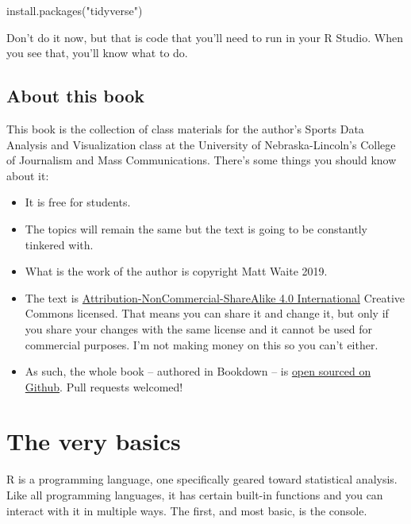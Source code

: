 \documentclass[
]{book}
\newenvironment{Shaded}{\begin{snugshade}}{\end{snugshade}}
\newcommand{\FunctionTok}[1]{\textcolor[rgb]{0.00,0.00,0.00}{#1}}
\newcommand{\NormalTok}[1]{#1}
\newcommand{\StringTok}[1]{\textcolor[rgb]{0.31,0.60,0.02}{#1}}
\providecommand{\tightlist}{%
  \setlength{\itemsep}{0pt}\setlength{\parskip}{0pt}}
\begin{document}
\begin{Shaded}
\begin{Highlighting}[]
\FunctionTok{install.packages}\NormalTok{(}\StringTok{"tidyverse"}\NormalTok{)}
\end{Highlighting}
\end{Shaded}

Don't do it now, but that is code that you'll need to run in your R Studio. When you see that, you'll know what to do.

\hypertarget{about-this-book}{%
\section{About this book}\label{about-this-book}}

This book is the collection of class materials for the author's Sports Data Analysis and Visualization class at the University of Nebraska-Lincoln's College of Journalism and Mass Communications. There's some things you should know about it:

\begin{itemize}
\tightlist
\item
  It is free for students.
\item
  The topics will remain the same but the text is going to be constantly tinkered with.
\item
  What is the work of the author is copyright Matt Waite 2019.
\item
  The text is \href{https://creativecommons.org/licenses/by-nc-sa/4.0/}{Attribution-NonCommercial-ShareAlike 4.0 International} Creative Commons licensed. That means you can share it and change it, but only if you share your changes with the same license and it cannot be used for commercial purposes. I'm not making money on this so you can't either.\\
\item
  As such, the whole book -- authored in Bookdown -- is \href{https://github.com/mattwaite/sportsdatabook}{open sourced on Github}. Pull requests welcomed!
\end{itemize}

\hypertarget{the-very-basics}{%
\chapter{The very basics}\label{the-very-basics}}

R is a programming language, one specifically geared toward statistical analysis. Like all programming languages, it has certain built-in functions and you can interact with it in multiple ways. The first, and most basic, is the console.
\end{document}

